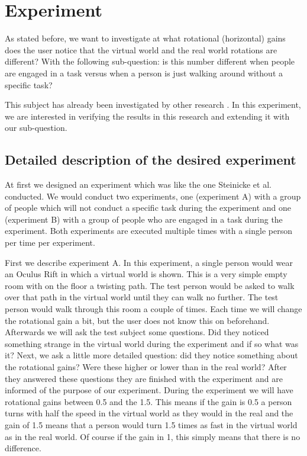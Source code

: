 \section{Experiment}
As stated before, we want to investigate at what rotational (horizontal) gains does the user notice that the virtual world and the real world rotations are different? 
With the following sub-question: is this number different when people are engaged in a task versus when a person is just walking around without a specific task?

This subject has already been investigated by other research \cite{steinicke1}\cite{steinicke2}. 
In this experiment, we are interested in verifying the results in this research and extending it with our sub-question.

\subsection{Detailed description of the desired experiment}\label{sec:description}
At first we designed an experiment which was like the one Steinicke et al. conducted. 
We would conduct two experiments, one (experiment A) with a group of people which will not conduct a specific task during the experiment and one (experiment B) with a group of people who are engaged in a task during the experiment. 
Both experiments are executed multiple times with a single person per time per experiment. 

First we describe experiment A.
In this experiment, a single person would wear an Oculus Rift in which a virtual world is shown.
This is a very simple empty room with on the floor a twisting path. 
The test person would be asked to walk over that path in the virtual world until they can walk no further. 
The test person would walk through this room a couple of times. 
Each time we will change the rotational gain a bit, but the user does not know this on beforehand. 
Afterwards we will ask the test subject some questions. 
Did they noticed something strange in the virtual world during the experiment and if so what was it? 
Next, we ask a little more detailed question: did they notice something about the rotational gains? 
Were these higher or lower than in the real world? 
After they answered these questions they are finished with the experiment and are informed of the purpose of our experiment.
During the experiment we will have rotational gains between 0.5 and the 1.5. 
This means if the gain is 0.5 a person turns with half the speed in the virtual world as they would in the real and the gain of 1.5 means that a person would turn 1.5 times as fast in the virtual world as in the real world. 
Of course if the gain in 1, this simply means that there is no difference.

